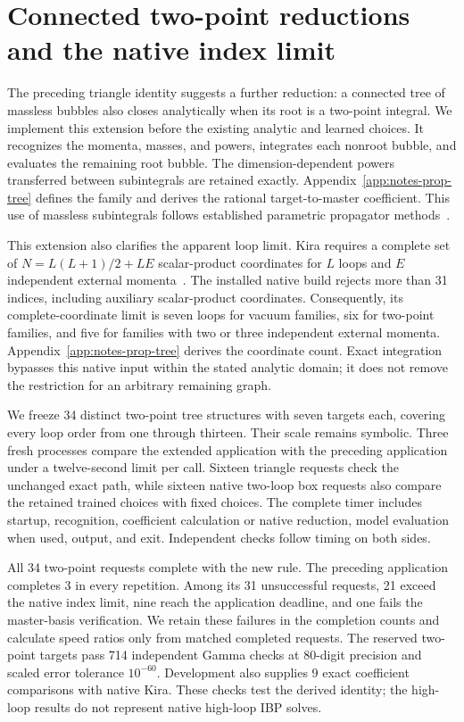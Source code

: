 \section{Connected two-point reductions and the native index limit}
\label{sec:notes-prop-tree}
The preceding triangle identity suggests a further reduction: a connected tree of massless bubbles also closes analytically when its root is a two-point integral. We implement this extension before the existing analytic and learned choices. It recognizes the momenta, masses, and powers, integrates each nonroot bubble, and evaluates the remaining root bubble. The dimension-dependent powers transferred between subintegrals are retained exactly. Appendix~\ref{app:notes-prop-tree} defines the family and derives the rational target-to-master coefficient. This use of massless subintegrals follows established parametric propagator methods~\cite{Ruijl2017Forcer}.

This extension also clarifies the apparent loop limit. Kira requires a complete set of $N=L(L+1)/2+LE$ scalar-product coordinates for $L$ loops and $E$ independent external momenta~\cite{Kira3}. The installed native build rejects more than 31 indices, including auxiliary scalar-product coordinates. Consequently, its complete-coordinate limit is seven loops for vacuum families, six for two-point families, and five for families with two or three independent external momenta. Appendix~\ref{app:notes-prop-tree} derives the coordinate count. Exact integration bypasses this native input within the stated analytic domain; it does not remove the restriction for an arbitrary remaining graph.

We freeze 34 distinct two-point tree structures with seven targets each, covering every loop order from one through thirteen. Their scale remains symbolic. Three fresh processes compare the extended application with the preceding application under a twelve-second limit per call. Sixteen triangle requests check the unchanged exact path, while sixteen native two-loop box requests also compare the retained trained choices with fixed choices. The complete timer includes startup, recognition, coefficient calculation or native reduction, model evaluation when used, output, and exit. Independent checks follow timing on both sides.

All 34 two-point requests complete with the new rule. The preceding application completes 3 in every repetition. Among its 31 unsuccessful requests, 21 exceed the native index limit, nine reach the application deadline, and one fails the master-basis verification. We retain these failures in the completion counts and calculate speed ratios only from matched completed requests. The reserved two-point targets pass 714 independent Gamma checks at 80-digit precision and scaled error tolerance $10^{-60}$. Development also supplies 9 exact coefficient comparisons with native Kira. These checks test the derived identity; the high-loop results do not represent native high-loop IBP solves.

